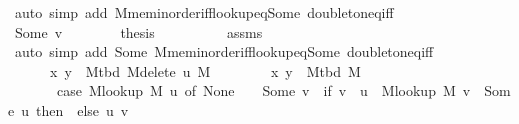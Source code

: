 \begin{isabellebody}
\ {\isacharparenleft}{\kern0pt}auto\ simp\ add{\isacharcolon}{\kern0pt}\ M{\isachardot}{\kern0pt}mem{\isacharunderscore}{\kern0pt}inorder{\isacharunderscore}{\kern0pt}iff{\isacharunderscore}{\kern0pt}lookup{\isacharunderscore}{\kern0pt}eq{\isacharunderscore}{\kern0pt}Some\ doubleton{\isacharunderscore}{\kern0pt}eq{\isacharunderscore}{\kern0pt}iff{\isacharparenright}{\kern0pt}\isanewline
\ \ \ \ \isamarkupfalse%
\isanewline
\ \ \ \ \ \ \isamarkupfalse%
\ {\isacharparenleft}{\kern0pt}Some\ v{\isacharparenright}{\kern0pt}\isanewline
\ \ \ \ \ \ \isamarkupfalse%
\ {\isacharquery}{\kern0pt}thesis\isanewline
\ \ \ \ \ \ \ \ \isamarkupfalse%
\ assms\isanewline
\ \ \ \ \ \ \ \ \isamarkupfalse%
\ {\isacharparenleft}{\kern0pt}auto\ simp\ add{\isacharcolon}{\kern0pt}\ Some\ M{\isachardot}{\kern0pt}mem{\isacharunderscore}{\kern0pt}inorder{\isacharunderscore}{\kern0pt}iff{\isacharunderscore}{\kern0pt}lookup{\isacharunderscore}{\kern0pt}eq{\isacharunderscore}{\kern0pt}Some\ doubleton{\isacharunderscore}{\kern0pt}eq{\isacharunderscore}{\kern0pt}iff{\isacharparenright}{\kern0pt}\isanewline
\ \ \ \ \isamarkupfalse%
\isanewline
\ \ \ \ \isamarkupfalse%
\ \isamarkupfalse%
\isanewline
\ \ \ \ \ \ {\isachardoublequoteopen}{\isacharbraceleft}{\kern0pt}x{\isacharcomma}{\kern0pt}\ y{\isacharbraceright}{\kern0pt}\ {\isasymin}\ M{\isacharunderscore}{\kern0pt}tbd\ {\isacharparenleft}{\kern0pt}M{\isacharunderscore}{\kern0pt}delete\ u\ M{\isacharparenright}{\kern0pt}\ {\isasymlongleftrightarrow}\isanewline
\ \ \ \ \ \ \ {\isacharbraceleft}{\kern0pt}x{\isacharcomma}{\kern0pt}\ y{\isacharbraceright}{\kern0pt}\ {\isasymin}\ M{\isacharunderscore}{\kern0pt}tbd\ M\ {\isacharminus}{\kern0pt}\isanewline
\ \ \ \ \ \ \ {\isacharparenleft}{\kern0pt}case\ M{\isacharunderscore}{\kern0pt}lookup\ M\ u\ of\ None\ {\isasymRightarrow}\ {\isacharbraceleft}{\kern0pt}{\isacharbraceright}{\kern0pt}\ {\isacharbar}{\kern0pt}\ Some\ v\ {\isasymRightarrow}\ if\ v\ {\isasymnoteq}\ u\ {\isasymand}\ M{\isacharunderscore}{\kern0pt}lookup\ M\ v\ {\isacharequal}{\kern0pt}\ Some\ u\ then\ {\isacharbraceleft}{\kern0pt}{\isacharbraceright}{\kern0pt}\ else\ {\isacharbraceleft}{\kern0pt}{\isacharbraceleft}{\kern0pt}u{\isacharcomma}{\kern0pt}\ v{\isacharbraceright}{\kern0pt}{\isacharbraceright}{\kern0pt}{\isacharparenright}{\kern0pt}{\isachardoublequoteclose}\isanewline
\ \ \ \ \ \ \isacommand{{\isachardot}{\kern0pt}}\isamarkupfalse%
\ \isacommand{{\isacharbraceright}{\kern0pt}}\isamarkupfalse%

\end{isabellebody}

